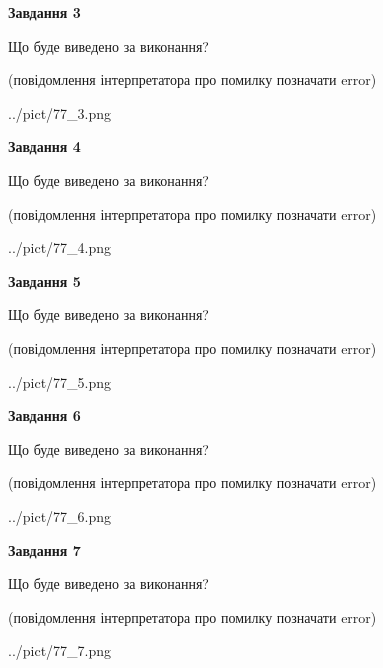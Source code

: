 \documentclass[12pt, ukrainian]{article}
\begin{document}
{\begin {large}
{\begin {center}\textbf{Завдання 3}\end {center}}\par
Що буде виведено за виконання?\par
 (повідомлення інтерпретатора про помилку позначати error)\par
\begin{center}
	{../pict/77_3.png}
\end{center}
\newpage

{\begin {center}\textbf{Завдання 4}\end {center}}\par
Що буде виведено за виконання?\par
 (повідомлення інтерпретатора про помилку позначати error)\par
\begin{center}
	{../pict/77_4.png}
\end{center}
\newpage

{\begin {center}\textbf{Завдання 5}\end {center}}\par
Що буде виведено за виконання?\par
 (повідомлення інтерпретатора про помилку позначати error)\par
\begin{center}
	{../pict/77_5.png}
\end{center}
\newpage

{\begin {center}\textbf{Завдання 6}\end {center}}\par
Що буде виведено за виконання?\par
 (повідомлення інтерпретатора про помилку позначати error)\par
\begin{center}
	{../pict/77_6.png}
\end{center}
\newpage

{\begin {center}\textbf{Завдання 7}\end {center}}\par
Що буде виведено за виконання?\par
 (повідомлення інтерпретатора про помилку позначати error)\par
\begin{center}
	{../pict/77_7.png}
\end{center}
\newpage


\end{large}}
\end{document}
